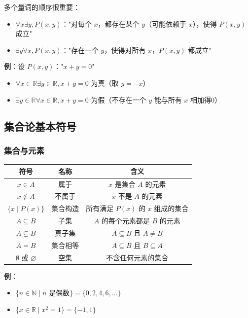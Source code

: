 \documentclass[12pt,a4paper,UTF8]{ctexart}
\begin{document}
多个量词的顺序很重要：
\begin{itemize}
    \item $\forall x \exists y, P(x,y)$："对每个 $x$，都存在某个 $y$（可能依赖于 $x$），使得 $P(x,y)$ 成立"
    \item $\exists y \forall x, P(x,y)$："存在一个 $y$，使得对所有 $x$，$P(x,y)$ 都成立"
\end{itemize}

\textbf{例}：设 $P(x,y)$："$x+y=0$"
\begin{itemize}
    \item $\forall x \in \mathbb{R} \exists y \in \mathbb{R}, x+y=0$ 为真（取 $y=-x$）
    \item $\exists y \in \mathbb{R} \forall x \in \mathbb{R}, x+y=0$ 为假（不存在一个 $y$ 能与所有 $x$ 相加得0）
\end{itemize}

\subsection{集合论基本符号}

\subsubsection{集合与元素}

\begin{table}[ht]
\centering
\begin{tabular}{|c|c|c|}
\hline
符号 & 名称 & 含义 \\
\hline
$x \in A$ & 属于 & $x$ 是集合 $A$ 的元素 \\
\hline
$x \notin A$ & 不属于 & $x$ 不是 $A$ 的元素 \\
\hline
$\{x \mid P(x)\}$ & 集合构造 & 所有满足 $P(x)$ 的 $x$ 组成的集合 \\
\hline
$A \subseteq B$ & 子集 & $A$ 的每个元素都是 $B$ 的元素 \\
\hline
$A \subsetneq B$ & 真子集 & $A \subseteq B$ 且 $A \neq B$ \\
\hline
$A = B$ & 集合相等 & $A \subseteq B$ 且 $B \subseteq A$ \\
\hline
$\emptyset$ 或 $\varnothing$ & 空集 & 不含任何元素的集合 \\
\hline
\end{tabular}
\end{table}

\textbf{例}：
\begin{itemize}
    \item $\{n \in \mathbb{N} \mid n \text{ 是偶数}\} = \{0,2,4,6,\dots\}$
    \item $\{x \in \mathbb{R} \mid x^2 = 1\} = \{-1, 1\}$
\end{itemize}
\end{document}
